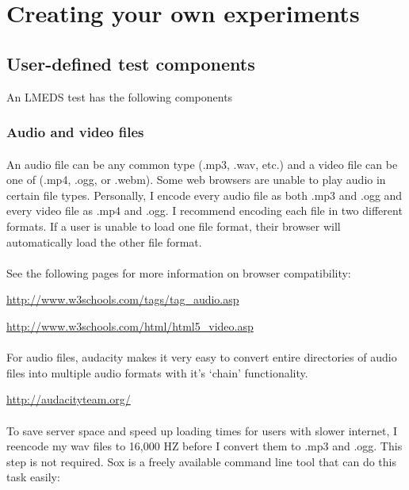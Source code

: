 
\section{Creating your own experiments}

\subsection{User-defined test components}

An LMEDS test has the following components

\subsubsection{Audio and video files}

\paragraph{}
An audio file can be any common type (.mp3, .wav, etc.) and a video file can be one of (.mp4, .ogg, or .webm).   Some web browsers are unable to play audio in certain file types.  Personally, I encode every audio file as both .mp3 and .ogg and every video file as .mp4 and .ogg.  I recommend encoding each file in two different formats.  If a user is unable to load one file format, their browser will automatically load the other file format.

\paragraph{}
See the following pages for more information on browser compatibility:

\url{http://www.w3schools.com/tags/tag\_audio.asp}

\url{http://www.w3schools.com/html/html5_video.asp}

\paragraph{}
For audio files, audacity makes it very easy to convert entire directories of audio files into multiple audio formats with it's `chain' functionality.  

\url{http://audacityteam.org/}

\paragraph{}
To save server space and speed up loading times for users with slower internet, I reencode my wav files to 16,000 HZ before I convert them to .mp3 and .ogg.  This step is not required.  Sox is a freely available command line tool that can do this task easily:

